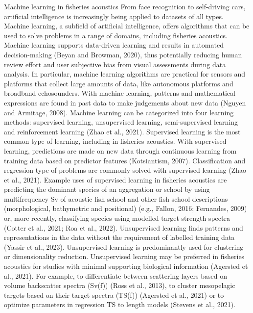 Machine learning in fisheries acoustics
From face recognition to self-driving cars, artificial intelligence is increasingly being applied to datasets of all types. Machine learning, a subfield of artificial intelligence, offers algorithms that can be used to solve problems in a range of domains, including fisheries acoustics. Machine learning supports data-driven learning and results in automated decision-making (Beyan and Browman, 2020), thus potentially reducing human review effort and user subjective bias from visual assessments during data analysis. In particular, machine learning algorithms are practical for sensors and platforms that collect large amounts of data, like autonomous platforms and broadband echosounders. With machine learning, patterns and mathematical expressions are found in past data to make judgements about new data (Nguyen and Armitage, 2008). 
Machine learning can be categorized into four learning methods: supervised learning, unsupervised learning, semi-supervised learning and reinforcement learning (Zhao et al., 2021). Supervised learning is the most common type of learning, including in fisheries acoustics. With supervised learning, predictions are made on new data through continuous learning from training data based on predictor features (Kotsiantism, 2007). Classification and regression type of problems are commonly solved with supervised learning (Zhao et al., 2021). Example uses of supervised learning in fisheries acoustics are predicting the dominant species of an aggregation or school by using multifrequency Sv of acoustic fish school and other fish school descriptions (morphological, bathymetric and positional) (e.g., Fallon, 2016; Fernandes, 2009) or, more recently, classifying species using modelled target strength spectra (Cotter et al., 2021; Roa et al., 2022). Unsupervised learning finds patterns and representations in the data without the requirement of labelled training data (Yassir et al., 2023). Unsupervised learning is predominantly used for clustering or dimensionality reduction. Unsupervised learning may be preferred in fisheries acoustics for studies with minimal supporting biological information (Agersted et al., 2021). For example, to differentiate between scattering layers based on volume backscatter spectra (Sv(f)) (Ross et al., 2013), to cluster mesopelagic targets based on their target spectra (TS(f)) (Agersted et al., 2021) or to optimize parameters in regression TS to length models (Stevens et al., 2021).
